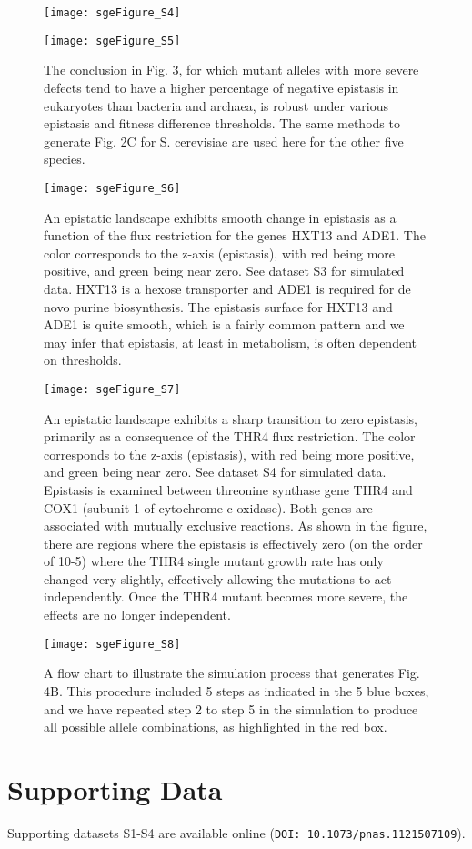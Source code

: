 \begin{figure}[H]
\centering
  \texttt{[image: sgeFigure\_S4]}
\end{figure}

\begin{figure}[H]
\centering
  \texttt{[image: sgeFigure\_S5]}
\caption{The conclusion in Fig. 3, for which mutant alleles with more
severe defects tend to have a higher percentage of negative epistasis
in eukaryotes than bacteria and archaea, is robust under various
epistasis and fitness difference thresholds. The same methods to
generate Fig. 2C for S. cerevisiae are used here for the other five
species.}
\label{fig:sgeS5}
\end{figure}

\begin{figure}[H]
\centering
  \texttt{[image: sgeFigure\_S6]}
\caption{An epistatic landscape exhibits smooth change in epistasis as
a function of the flux restriction for the genes HXT13 and ADE1. The
color corresponds to the z-axis (epistasis), with red being more
positive, and green being near zero. See dataset S3 for simulated
data. HXT13 is a hexose transporter and ADE1 is required for de novo
purine biosynthesis. The epistasis surface for HXT13 and ADE1 is quite
smooth, which is a fairly common pattern and we may infer that
epistasis, at least in metabolism, is often dependent on thresholds.}
\label{fig:sgeS6}
\end{figure}

\begin{figure}[H]
\centering
  \texttt{[image: sgeFigure\_S7]}
\caption{An epistatic landscape exhibits a sharp transition to zero
epistasis, primarily as a consequence of the THR4 flux
restriction. The color corresponds to the z-axis (epistasis), with red
being more positive, and green being near zero. See dataset S4 for
simulated data. Epistasis is examined between threonine synthase gene
THR4 and COX1 (subunit 1 of cytochrome c oxidase). Both genes are
associated with mutually exclusive reactions. As shown in the figure,
there are regions where the epistasis is effectively zero (on the
order of 10-5) where the THR4 single mutant growth rate has only
changed very slightly, effectively allowing the mutations to act
independently. Once the THR4 mutant becomes more severe, the effects
are no longer independent.}
\label{fig:sgeS7}
\end{figure}

\begin{figure}[H]
\centering
  \texttt{[image: sgeFigure\_S8]}
\caption{A flow chart to illustrate the simulation process that
generates Fig. 4B. This procedure included 5 steps as indicated in the
5 blue boxes, and we have repeated step 2 to step 5 in the simulation
to produce all possible allele combinations, as highlighted in the red
box.}
\label{fig:sgeS8}
\end{figure}

\section{Supporting Data}

Supporting datasets S1-S4 are available online (\texttt{DOI:
10.1073/pnas.1121507109}).